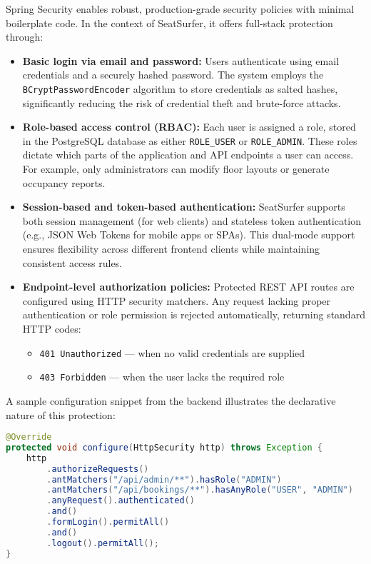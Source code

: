 \documentclass[12pt,a4paper]{report}
\begin{document}
Spring Security enables robust, production-grade security policies with minimal boilerplate code. In the context of SeatSurfer, it offers full-stack protection through:

\begin{itemize}
    \item \textbf{Basic login via email and password:} Users authenticate using email credentials and a securely hashed password. The system employs the \texttt{BCryptPasswordEncoder} algorithm to store credentials as salted hashes, significantly reducing the risk of credential theft and brute-force attacks.

    \item \textbf{Role-based access control (RBAC):} Each user is assigned a role, stored in the PostgreSQL database as either \verb|ROLE_USER| or \verb|ROLE_ADMIN|. These roles dictate which parts of the application and API endpoints a user can access. For example, only administrators can modify floor layouts or generate occupancy reports.

    \item \textbf{Session-based and token-based authentication:} SeatSurfer supports both session management (for web clients) and stateless token authentication (e.g., JSON Web Tokens for mobile apps or SPAs). This dual-mode support ensures flexibility across different frontend clients while maintaining consistent access rules.

    \item \textbf{Endpoint-level authorization policies:} Protected REST API routes are configured using HTTP security matchers. Any request lacking proper authentication or role permission is rejected automatically, returning standard HTTP codes:
    \begin{itemize}
        \item \texttt{401 Unauthorized} — when no valid credentials are supplied
        \item \texttt{403 Forbidden} — when the user lacks the required role
    \end{itemize}
\end{itemize}

\noindent
A sample configuration snippet from the backend illustrates the declarative nature of this protection:

\begin{lstlisting}[language=Java, caption=Spring Security Configuration Snippet]
@Override
protected void configure(HttpSecurity http) throws Exception {
    http
        .authorizeRequests()
        .antMatchers("/api/admin/**").hasRole("ADMIN")
        .antMatchers("/api/bookings/**").hasAnyRole("USER", "ADMIN")
        .anyRequest().authenticated()
        .and()
        .formLogin().permitAll()
        .and()
        .logout().permitAll();
}
\end{lstlisting}
\end{document}
